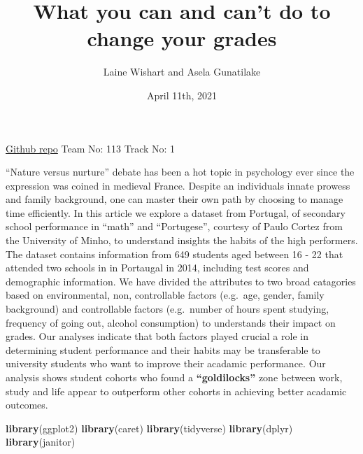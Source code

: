 \documentclass[
]{article}
\title{What you can and can't do to change your grades}
\author{Laine Wishart and Asela Gunatilake}
\date{April 11th, 2021}
\newenvironment{Shaded}{\begin{snugshade}}{\end{snugshade}}
\newcommand{\KeywordTok}[1]{\textcolor[rgb]{0.13,0.29,0.53}{\textbf{#1}}}
\newcommand{\NormalTok}[1]{#1}
\begin{document}
\maketitle

\href{https://github.com/LaineWishart/stanford-datathon}{Github repo}
\textbar{} Team No: 113 \textbar{} Track No: 1

``Nature versus nurture'' debate has been a hot topic in psychology ever
since the expression was coined in medieval France. Despite an
individuals innate prowess and family background, one can master their
own path by choosing to manage time efficiently. In this article we
explore a dataset from Portugal, of secondary school performance in
``math'' and ``Portugese'', courtesy of Paulo Cortez from the University
of Minho, to understand insights the habits of the high performers. The
dataset contains information from 649 students aged between 16 - 22 that
attended two schools in in Portaugal in 2014, including test scores and
demographic information. We have divided the attributes to two broad
catagories based on environmental, non, controllable factors (e.g.~age,
gender, family background) and controllable factors (e.g.~number of
hours spent studying, frequency of going out, alcohol consumption) to
understands their impact on grades. Our analyses indicate that both
factors played crucial a role in determining student performance and
their habits may be transferable to university students who want to
improve their acadamic performance. Our analysis shows student cohorts
who found a \textbf{``goldilocks''} zone between work, study and life
appear to outperform other cohorts in achieving better acadamic
outcomes.

\begin{Shaded}
\begin{Highlighting}[]
\KeywordTok{library}\NormalTok{(ggplot2)}
\KeywordTok{library}\NormalTok{(caret)}
\KeywordTok{library}\NormalTok{(tidyverse)}
\KeywordTok{library}\NormalTok{(dplyr)}
\KeywordTok{library}\NormalTok{(janitor)}
\end{Highlighting}
\end{Shaded}
\end{document}
